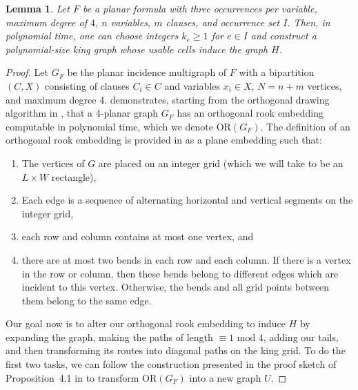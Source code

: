 \documentclass[11pt]{article}
\theoremstyle{plain}
\newtheorem{lemma}[theorem]{Lemma}
\begin{document}
\begin{lemma} \label{lem:gridrealization}
    Let $F$ be a planar formula with three occurrences per variable, maximum degree of $4$, $n$ variables, $m$ clauses, and occurrence set $I$. Then, in polynomial time, one can choose integers $k_e \geq 1$ for $e \in I$ and construct a polynomial-size king graph whose usable cells induce the graph $H$.
\end{lemma}

\begin{proof}

Let $G_F$ be the planar incidence multigraph of $F$ with a bipartition $(C, X)$ consisting of clauses $C_i \in C$ and variables $x_i \in X$, $N= n+m$ vertices, and maximum degree 4. \citet[Lemma~24, pp.~338-339]{scheffler2022distance} demonstrates, starting from the orthogonal drawing algorithm in \citet{tamassia1989gridembed}, that a 4-planar graph $G_F$ has an orthogonal rook embedding computable in polynomial time, which we denote $\mathrm{OR}(G_F)$. The definition of an orthogonal rook embedding is provided in \citet[Definition~23, p.~338]{scheffler2022distance} as a plane embedding such that:
\begin{enumerate}
    \item The vertices of $G$ are placed on an integer grid (which we will take to be an $L \times W$ rectangle),
    \item Each edge is a sequence of alternating horizontal and vertical segments on the integer grid,
    \item each row and column contains at most one vertex, and
    \item there are at most two bends in each row and each column. If there is a vertex in the row or column, then these bends belong to different edges which are incident to this vertex. Otherwise, the bends and all grid points between them belong to the same edge.
\end{enumerate}

Our goal now is to alter our orthogonal rook embedding to induce $H$ by expanding the graph, making the paths of length $\equiv 1 \text{ mod } 4$, adding our tails, and then transforming its routes into diagonal paths on the king grid. To do the first two tasks, we can follow the construction presented in the proof sketch of Proposition~4.1 in \citet[pp.~240-241]{demange2013matching} to transform $\mathrm{OR}(G_F)$ into a new graph $U$. 


\end{proof}
\end{document}
